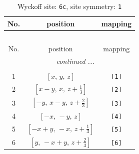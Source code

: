 \documentclass[fleqn,8pt]{jsarticle}
\begin{document}
\renewcommand{\arraystretch}{1.2}
\begin{longtable}{ccc}
\caption{Wyckoff site: {\tt 6c}, site symmetry: {\tt 1}}
 \\
 \hline \hline
No. & position & mapping \\ \hline \endfirsthead

\multicolumn{2}{l}{\tablename\ \thetable{}} \\
 \hline \hline
No. & position & mapping \\ \hline \endhead

 \hline \hline
\multicolumn{2}{r}{\footnotesize\it continued ...} \\ \endfoot

 \hline \hline
\multicolumn{2}{r}{} \\ \endlastfoot

1 & $\left[ x,\, y,\, z \right]$ & {\tt [1]} \\ \hline
2 & $\left[ x - y,\, x,\, z + \frac{1}{3} \right]$ & {\tt [2]} \\ \hline
3 & $\left[ - y,\, x - y,\, z + \frac{2}{3} \right]$ & {\tt [3]} \\ \hline
4 & $\left[ - x,\, - y,\, z \right]$ & {\tt [4]} \\ \hline
5 & $\left[ - x + y,\, - x,\, z + \frac{1}{3} \right]$ & {\tt [5]} \\ \hline
6 & $\left[ y,\, - x + y,\, z + \frac{2}{3} \right]$ & {\tt [6]} \\
\end{longtable}
\end{document}
